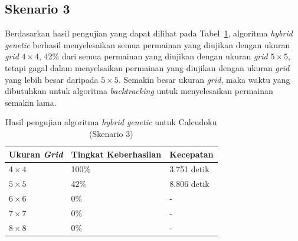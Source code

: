 \subsection{Skenario 3}
\label{sec:skenario3}

Berdasarkan hasil pengujian yang dapat dilihat pada Tabel~\ref{tab:pengujianhg3}, algoritma \textit{hybrid genetic} berhasil menyelesaikan semua permainan yang diujikan dengan ukuran \textit{grid} \begin{math}4 \times 4\end{math}, 42\% dari semua permainan yang diujikan dengan ukuran \textit{grid} \begin{math}5 \times 5\end{math}, tetapi gagal dalam menyelsaikan permainan yang diujikan dengan ukuran \textit{grid} yang lebih besar daripada \begin{math}5 \times 5\end{math}. Semakin besar ukuran \textit{grid}, maka waktu yang dibutuhkan untuk algoritma \textit{backtracking} untuk menyelesaikan permainan semakin lama.

\begin{table}
\centering
\captionsetup{justification=centering}
\caption[Hasil pengujian algoritma \textit{hybrid genetic} untuk Calcudoku (Skenario 3)]{Hasil pengujian algoritma \textit{hybrid genetic} untuk Calcudoku (Skenario 3)}
\begin{tabular}{| l | l | l |}
\hline
Ukuran \textit{Grid} & Tingkat Keberhasilan & Kecepatan \\
\hline \hline
\begin{math}4 \times 4\end{math} & 100\% & 3.751 detik \\
\hline
\begin{math}5 \times 5\end{math} & 42\% & 8.806 detik \\
\hline
\begin{math}6 \times 6\end{math} & 0\% & - \\
\hline
\begin{math}7 \times 7\end{math} & 0\% & - \\
\hline
\begin{math}8 \times 8\end{math} & 0\% & - \\
\hline
\end{tabular}
\label{tab:pengujianhg3}
\end{table}


